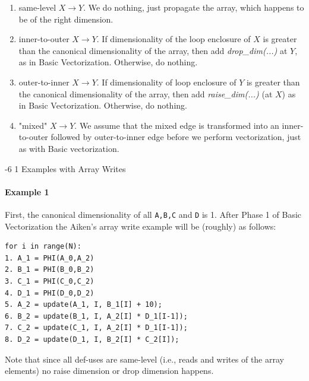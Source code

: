 \documentclass[sigconf, screen, natbib=false, dvipsnames, table]{acmart}
\makeatletter
\renewcommand{\subsubsection}{\@startsection{subsubsection}{3}{\z@}%
                        {-6\p@ \@plus -4\p@ \@minus -4\p@}%
                        {1\p@ \@plus 1\p@ \@minus 0\p@}%
                        {\normalfont\normalsize\bfseries\boldmath}}
\theoremstyle{definition}
\makeatother
\begin{document}
\begin{enumerate}

\item same-level $X \rightarrow Y$. We do nothing, just propagate the array, which happens to be of the right dimension. 

\item inner-to-outer $X \rightarrow Y$. If dimensionality of the loop enclosure of $X$ is greater than the canonical dimensionality of the array, then add \emph{drop\_dim(...)} at $Y$, as in Basic Vectorization. Otherwise, do nothing.

\item outer-to-inner $X \rightarrow Y$. If dimensionality of loop enclosure of $Y$ is greater than the canonical dimensionality of the array, then add \emph{raise\_dim(...)} (at $X$) as in Basic Vectorization. Otherwise, do nothing.

\item "mixed" $X \rightarrow Y$. We assume that the mixed edge is transformed into an inner-to-outer followed by outer-to-inner edge before we perform vectorization, just as with Basic vectorization.

\end{enumerate}

\subsubsection{Examples with Array Writes}

\paragraph{Example 1}

First, the canonical dimensionality of all \texttt{A,B,C} and \texttt{D} is 1. 
After Phase 1 of Basic Vectorization the Aiken's array write example will be (roughly) as follows:

{\small
\begin{verbatim}
for i in range(N):
1. A_1 = PHI(A_0,A_2)
2. B_1 = PHI(B_0,B_2)
3. C_1 = PHI(C_0,C_2)
4. D_1 = PHI(D_0,D_2)
5. A_2 = update(A_1, I, B_1[I] + 10); 
6. B_2 = update(B_1, I, A_2[I] * D_1[I-1]);
7. C_2 = update(C_1, I, A_2[I] * D_1[I-1]);
8. D_2 = update(D_1, I, B_2[I] * C_2[I]);
\end{verbatim}
}

Note that since all def-uses are same-level (i.e., reads and writes of the array elements) 
no raise dimension or drop dimension happens.
\end{document}
